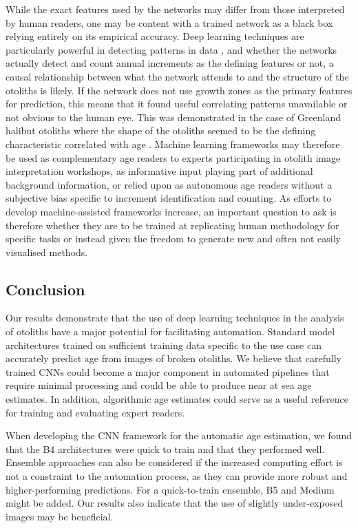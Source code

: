 \documentclass[10pt,letterpaper]{article}
\begin{document}
While the exact features used by the networks may differ from those interpreted by human readers, one may be content with a trained network as a black box relying entirely on its empirical accuracy. Deep learning techniques are particularly powerful in detecting patterns in data \citep{lecun2015deep}, and whether the networks actually detect and count annual increments as the defining features or not, a causal relationship between what the network attends to and the structure of the otoliths is likely. If the network does not use growth zones as the primary features for prediction, this means that it found useful correlating patterns unavailable or not obvious to the human eye. This was demonstrated in the case of Greenland halibut otoliths where the shape of the otoliths seemed to be the defining characteristic correlated with age \citep{ordonez2020explaining}. Machine learning frameworks may therefore be used as complementary age readers to experts participating in otolith image interpretation workshops, as informative input playing part of additional background information, or relied upon as autonomous age readers without a subjective bias specific to increment identification and counting. As efforts to develop machine-assisted frameworks increase, an important question to ask is therefore whether they are to be trained at replicating human methodology for specific tasks or instead given the freedom to generate new and often not easily visualised methods. 

\subsection{Conclusion}
Our results demonstrate that the use of deep learning techniques in the analysis of otoliths have a major potential for facilitating automation.  Standard model architectures trained on sufficient training data specific to the use case can accurately predict age from images of broken otoliths. We believe that carefully trained CNNs could become a major component in automated pipelines that require minimal processing and could be able to produce near at sea age estimates.  In addition, algorithmic age estimates could serve as a useful reference for training and evaluating expert readers.

When developing the CNN framework for the automatic age estimation, we found that the B4 architectures were quick to train and that they performed well. Ensemble approaches can also be considered if the increased computing effort is not a constraint to the automation process, as they can provide  more robust and higher-performing predictions. For a quick-to-train ensemble, B5 and Medium might be added. Our results also indicate that the use of slightly under-exposed images may be beneficial.
\end{document}
